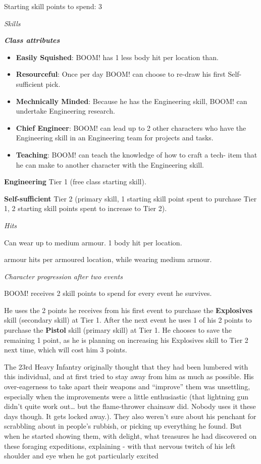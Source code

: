 \documentclass{scrbook}
\begin{document}
Starting skill points to spend: 3

\textit{Skills}

\textbf{\textit{Class attributes}}

\begin{itemize}
\item \textbf{Easily Squished}: BOOM! has 1 less body hit per location than.

\item \textbf{Resourceful}: Once per day BOOM! can choose to re-draw his first Self-sufficient pick.

\item \textbf{Mechnically Minded}: Because he has the Engineering skill, BOOM! can undertake Engineering research.

\item \textbf{Chief Engineer}: BOOM! can lead up to 2 other characters who have the Engineering skill in an Engineering team for projects and tasks.

\item \textbf{Teaching}: BOOM! can teach the knowledge of how to craft a tech- item that he can make to another character with the Engineering skill.

\end{itemize}
\textbf{Engineering} Tier 1 (free class starting skill).

\textbf{Self-sufficient} Tier 2 (primary skill, 1 starting skill point spent to purchase Tier 1, 2 starting skill points spent to increase to Tier 2).

\textit{Hits}

Can wear up to medium armour. 1 body hit per location.

armour hits per armoured location, while wearing medium armour.

\textit{Character progression after two events}

BOOM! receives 2 skill points to spend for every event he survives.

He uses the 2 points he receives from his first event to purchase the \textbf{Explosives} skill (secondary skill) at Tier 1. After the next event he uses 1 of his 2 points to purchase the \textbf{Pistol} skill (primary skill) at Tier 1. He chooses to save the remaining 1 point, as he is planning on increasing his Explosives skill to Tier 2 next time, which will cost him 3 points.

The 23rd Heavy Infantry originally thought that they had been lumbered with this individual, and at first tried to stay away from him as much as possible. His over-eagerness to take apart their weapons and ``improve'' them was unsettling, especially when the improvements were a little enthusiastic (that lightning gun didn't quite work out{\dots} but the flame-thrower chainsaw did. Nobody uses it these days though. It gets locked away.). They also weren't sure about his penchant for scrabbling about in people's rubbish, or picking up everything he found. But when he started showing them, with delight, what treasures he had discovered on these foraging expeditions, explaining - with that nervous twitch of his left shoulder and eye when he got particularly excited
\end{document}
